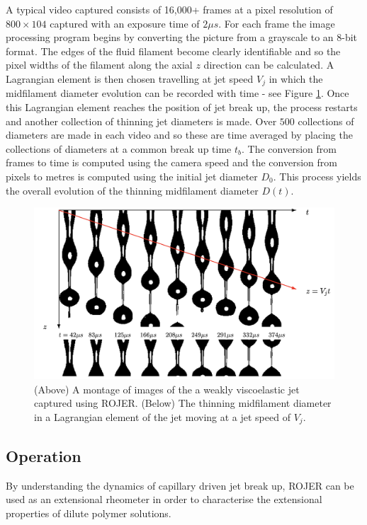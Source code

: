 \documentclass[11pt]{article}
\begin{document}
A typical video captured consists of 16,000+ frames at a pixel resolution of 
$800 \times 104$ captured with an exposure time of $2 \mu s$. For each frame 
the image processing program begins by converting the picture from a grayscale 
to an 8-bit format. The edges of the fluid filament become clearly identifiable 
and so the pixel widths of the filament along the axial $z$ direction can be 
calculated. A Lagrangian element is then chosen travelling at jet speed $V_j$ 
in which the midfilament diameter evolution can be recorded with time - see 
Figure \ref{fig:image_analysis}. Once this Lagrangian element reaches the 
position of jet break up, the process restarts and another collection of 
thinning jet diameters is made. Over $500$ collections of diameters are made in 
each video and so these are time averaged by placing the collections of 
diameters at a common break up time $t_b$. The conversion from frames to time 
is computed using the camera speed and the conversion from pixels to metres is 
computed using the initial jet diameter $D_0$. This process yields the overall 
evolution of the thinning midfilament diameter $D(t)$.
\begin{figure}
	\includegraphics{img/image_analysis.png}
	\caption{(Above) A montage of images of the a weakly viscoelastic jet 
captured using ROJER. (Below) The thinning midfilament diameter in a Lagrangian 
element of the jet moving at a jet speed of $V_j$.}
	\label{fig:image_analysis}
\end{figure}

\subsection{Operation}
By understanding the dynamics of capillary driven jet break up, ROJER can be 
used as an extensional rheometer in order to characterise the extensional 
properties of dilute polymer solutions.
\end{document}
